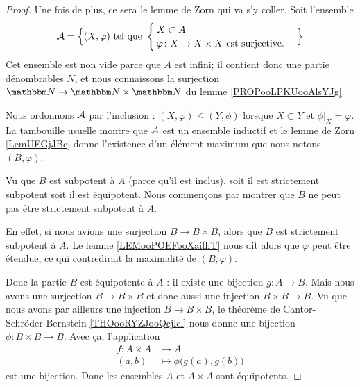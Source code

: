 \begin{proof}
    Une fois de plus, ce sera le lemme de Zorn qui va s'y coller. Soit l'ensemble
    \begin{equation}
       \mathcal{A}=\Big\{  (X,\varphi)  \text{ tel que }
        \begin{cases}
            X\subset A\\
            \varphi\colon X\to X\times X\text{ est surjective.}
        \end{cases}
    \Big\}
    \end{equation}
    Cet ensemble est non vide parce que \( A\) est infini; il contient donc une partie dénombrables \( N\), et nous connaissons la surjection \( \eN\to \eN\times \eN\) du lemme \ref{PROPooLPKUooAlsYJg}.

    Nous ordonnons \( \mathcal{A}\) par l'inclusion : \( (X,\varphi)\leq (Y,\phi)\) lorsque \( X\subset Y\) et \( \phi|_X=\varphi\). La tambouille usuelle montre que \( \mathcal{A}\) est un ensemble inductif et le lemme de Zorn \ref{LemUEGjJBc} donne l'existence d'un élément maximum que nous notons \( (B,\varphi)\).

    Vu que \( B\) est subpotent à \( A\) (parce qu'il est inclus), soit il est strictement subpotent soit il est équipotent. Nous commençons par montrer que \( B\) ne peut pas être strictement subpotent à \( A\).

    En effet, si nous avions une surjection \( B\to B\times B\), alors que \( B\) est strictement subpotent à \( A\). Le lemme \ref{LEMooPOEFooXaifhT} nous dit alors que \( \varphi\) peut être étendue, ce qui contredirait la maximalité de \( (B,\varphi)\).

    Donc la partie \( B\) est équipotente à \( A\) : il existe une bijection \( g\colon A\to B\). Mais nous avons une surjection \( B\to B\times B\) et donc aussi une injection \( B\times B\to B\). Vu que nous avons par ailleurs une injection \( B\to B\times B\), le théorème de Cantor-Schröder-Bernstein \ref{THOooRYZJooQcjlcl} nous donne une bijection \( \phi\colon B\times B\to B\). Avec ça, l'application
    \begin{equation}
        \begin{aligned}
            f\colon A\times A&\to A \\
            (a,b)&\mapsto \phi\big( g(a),g(b) \big) 
        \end{aligned}
    \end{equation}
    est une bijection. Donc les ensembles \( A\) et \( A\times A\) sont équipotents.
\end{proof}

